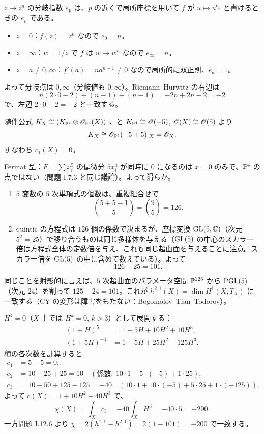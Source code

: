 $z\mapsto z^n$ の分岐指数 $e_p$ は、$p$ の近くで局所座標を用いて $f$ が $u\mapsto u^{e_p}$ と書けるときの $e_p$ である。
\begin{itemize}
  \item $z=0$：$f(z)=z^n$ なので $e_0=n$。
  \item $z=\infty$：$w=1/z$ で $f$ は $w\mapsto w^n$ なので $e_\infty=n$。
  \item $z=a\neq0,\infty$：$f'(a)=na^{n-1}\neq0$ なので局所的に双正則、$e_a=1$。
\end{itemize}
よって分岐点は $0,\infty$（分岐値も $0,\infty$）。Riemann--Hurwitz の右辺は
\[
  n(2\cdot0-2)+(n-1)+(n-1)=-2n+2n-2=-2
\]
で、左辺 $2\cdot0-2=-2$ と一致する。

随伴公式 $K_X\cong(K_{\mathbb{P}^4}\otimes\mathscr{O}_{\mathbb{P}^4}(X))|_X$ と $K_{\mathbb{P}^4}\cong\mathscr{O}(-5)$, $\mathscr{O}(X)\cong\mathscr{O}(5)$ より
\[
  K_X\cong\mathscr{O}_{\mathbb{P}^4}(-5+5)|_X=\mathscr{O}_X.
\]
すなわち $c_1(X)=0$。

Fermat 型：$F=\sum x_i^5$ の偏微分 $5x_i^4$ が同時に $0$ になるのは $x=0$ のみで、$\mathbb{P}^4$ の点ではない（問題 I.7.3 と同じ議論）。よって滑らか。

\begin{enumerate}
  \item $5$ 変数の $5$ 次単項式の個数は、重複組合せで
  \[
    \binom{5+5-1}{5}=\binom95=126.
  \]
  \item quintic の方程式は $126$ 個の係数で決まるが、座標変換 $\operatorname{GL}(5,\mathbb{C})$（次元 $5^2=25$）で移り合うものは同じ多様体を与える（$\operatorname{GL}(5)$ の中心のスカラー倍は方程式全体の定数倍を与え、これも同じ超曲面を与えることに注意。スカラー倍を $\operatorname{GL}(5)$ の中に含めて数えている）。よって
  \[
    126-25=101.
  \]
\end{enumerate}
同じことを射影的に言えば、$5$ 次超曲面のパラメータ空間 $\mathbb{P}^{125}$ から $\operatorname{PGL}(5)$（次元 $24$）を割って $125-24=101$。これが $h^{2,1}(X)=\dim H^1(X,T_X)$ に一致する（CY の変形は障害をもたない：Bogomolov--Tian--Todorov）。

$H^4=0$（$X$ 上では $H^k=0$, $k>3$）として展開する：
\begin{align*}
  (1+H)^5&=1+5H+10H^2+10H^3,\\
  (1+5H)^{-1}&=1-5H+25H^2-125H^3.
\end{align*}
積の各次数を計算すると
\begin{align*}
  c_1&=5-5=0,\\
  c_2&=10-25+25=10\quad(\text{係数}:\ 10\cdot1+5\cdot(-5)+1\cdot25),\\
  c_3&=10-50+125-125=-40\quad(10\cdot1+10\cdot(-5)+5\cdot25+1\cdot(-125)).
\end{align*}
よって $c(X)=1+10H^2-40H^3$ で、
\[
  \chi(X)=\int_Xc_3=-40\int_XH^3=-40\cdot5=-200.
\]
一方問題 I.12.6 より $\chi=2(h^{1,1}-h^{2,1})=2(1-101)=-200$ で一致する。

